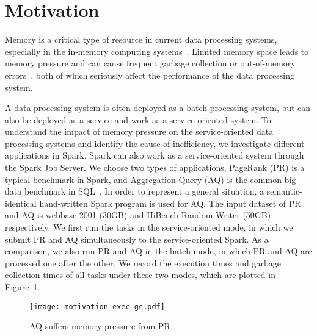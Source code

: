 \section{Motivation}
\label{sec:motivation}

Memory is a critical type of resource in current data processing systems, especially in the in-memory computing systems~\cite{shi:mammoth}. Limited memory space leads to memory pressure and can cause frequent garbage collection or out-of-memory errors~\cite{fang2015interruptible}, both of which seriously affect the performance of the data processing system.

A data processing system is often deployed as a batch processing system, but can also be deployed as a service and work as a service-oriented system. To understand the impact of memory pressure on the service-oriented data processing systems and identify the cause of inefficiency, we investigate different applications in Spark. Spark can also work as a service-oriented system through the Spark Job Server. We choose two types of applications, PageRank (PR)  
is a typical benchmark in Spark, and Aggregation Query (AQ) is the common big data benchmark in SQL~\cite{www:benchmark}. In order to represent a general situation, a semantic-identical hand-written Spark program is used for AQ. The input dataset of PR and AQ is webbase-2001 (30GB) and HiBench Random Writer (50GB), respectively. We first run the tasks in the service-oriented mode, in which we submit PR and AQ simultaneously to the service-oriented Spark.
As a comparison, we also run PR and AQ in the batch mode, in which PR and AQ are processed one after the other. We record the execution times and garbage collection times of all tasks under these two modes, which are plotted in Figure~\ref{fig:memorypressure}. 

\begin{figure}[!t]
\centering
\texttt{[image: motivation-exec-gc.pdf]}
\vspace{-2mm}
\caption{AQ suffers memory pressure from PR}
\vspace{-6mm}
\label{fig:memorypressure}
\end{figure}

